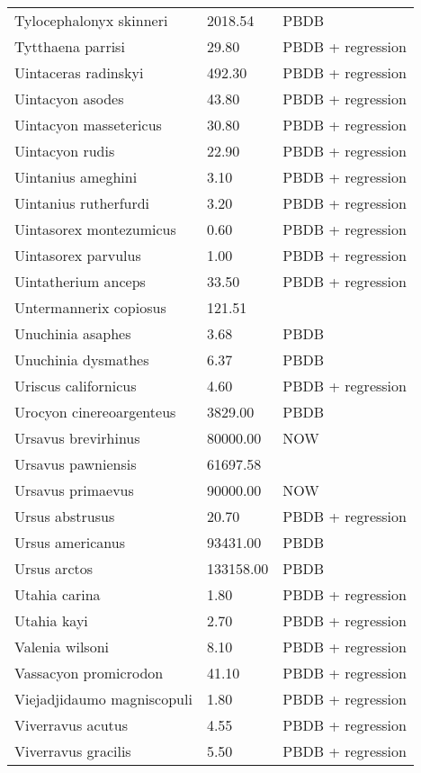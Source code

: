 \begin{longtable}{p{} p{} p{}}
    Tylocephalonyx skinneri & 2018.54 & PBDB \\ 
    Tytthaena parrisi & 29.80 & PBDB + regression \\ 
    Uintaceras radinskyi & 492.30 & PBDB + regression \\ 
    Uintacyon asodes & 43.80 & PBDB + regression \\ 
    Uintacyon massetericus & 30.80 & PBDB + regression \\ 
    Uintacyon rudis & 22.90 & PBDB + regression \\ 
    Uintanius ameghini & 3.10 & PBDB + regression \\ 
    Uintanius rutherfurdi & 3.20 & PBDB + regression \\ 
    Uintasorex montezumicus & 0.60 & PBDB + regression \\ 
    Uintasorex parvulus & 1.00 & PBDB + regression \\ 
    Uintatherium anceps & 33.50 & PBDB + regression \\ 
    Untermannerix copiosus & 121.51 & \cite{Tomiya2013} \\ 
    Unuchinia asaphes & 3.68 & PBDB \\ 
    Unuchinia dysmathes & 6.37 & PBDB \\ 
    Uriscus californicus & 4.60 & PBDB + regression \\ 
    Urocyon cinereoargenteus & 3829.00 & PBDB \\ 
    Ursavus brevirhinus & 80000.00 & NOW \\ 
    Ursavus pawniensis & 61697.58 & \cite{Tomiya2013} \\ 
    Ursavus primaevus & 90000.00 & NOW \\ 
    Ursus abstrusus & 20.70 & PBDB + regression \\ 
    Ursus americanus & 93431.00 & PBDB \\ 
    Ursus arctos & 133158.00 & PBDB \\ 
    Utahia carina & 1.80 & PBDB + regression \\ 
    Utahia kayi & 2.70 & PBDB + regression \\ 
    Valenia wilsoni & 8.10 & PBDB + regression \\ 
    Vassacyon promicrodon & 41.10 & PBDB + regression \\ 
    Viejadjidaumo magniscopuli & 1.80 & PBDB + regression \\ 
    Viverravus acutus & 4.55 & PBDB + regression \\ 
    Viverravus gracilis & 5.50 & PBDB + regression \\ 

\end{longtable}
